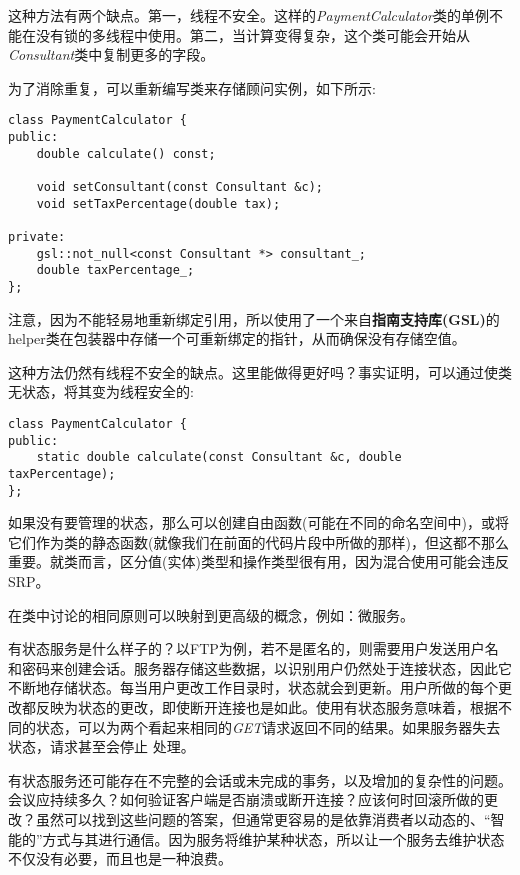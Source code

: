 这种方法有两个缺点。第一，线程不安全。这样的\textit{PaymentCalculator}类的单例不能在没有锁的多线程中使用。第二，当计算变得复杂，这个类可能会开始从\textit{Consultant}类中复制更多的字段。

为了消除重复，可以重新编写类来存储顾问实例，如下所示:

\begin{lstlisting}[style=styleCXX]
class PaymentCalculator {
public:
	double calculate() const;
	
	void setConsultant(const Consultant &c);
	void setTaxPercentage(double tax);
	
private:
	gsl::not_null<const Consultant *> consultant_;
	double taxPercentage_;
};
\end{lstlisting}

注意，因为不能轻易地重新绑定引用，所以使用了一个来自\textbf{指南支持库(GSL)}的helper类在包装器中存储一个可重新绑定的指针，从而确保没有存储空值。

这种方法仍然有线程不安全的缺点。这里能做得更好吗？事实证明，可以通过使类无状态，将其变为线程安全的:

\begin{lstlisting}[style=styleCXX]
class PaymentCalculator {
public:
	static double calculate(const Consultant &c, double taxPercentage);
};
\end{lstlisting}

如果没有要管理的状态，那么可以创建自由函数(可能在不同的命名空间中)，或将它们作为类的静态函数(就像我们在前面的代码片段中所做的那样)，但这都不那么重要。就类而言，区分值(实体)类型和操作类型很有用，因为混合使用可能会违反SRP。


在类中讨论的相同原则可以映射到更高级的概念，例如：微服务。

有状态服务是什么样子的？以FTP为例，若不是匿名的，则需要用户发送用户名和密码来创建会话。服务器存储这些数据，以识别用户仍然处于连接状态，因此它不断地存储状态。每当用户更改工作目录时，状态就会到更新。用户所做的每个更改都反映为状态的更改，即使断开连接也是如此。使用有状态服务意味着，根据不同的状态，可以为两个看起来相同的\textit{GET}请求返回不同的结果。如果服务器失去状态，请求甚至会停止 处理。

有状态服务还可能存在不完整的会话或未完成的事务，以及增加的复杂性的问题。会议应持续多久？如何验证客户端是否崩溃或断开连接？应该何时回滚所做的更改？虽然可以找到这些问题的答案，但通常更容易的是依靠消费者以动态的、“智能的”方式与其进行通信。因为服务将维护某种状态，所以让一个服务去维护状态不仅没有必要，而且也是一种浪费。


